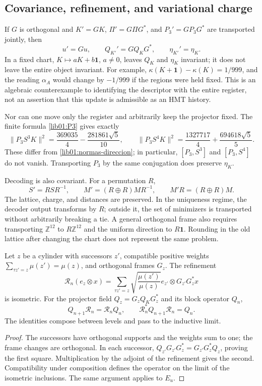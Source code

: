 \subsection{Covariance, refinement, and variational charge}
\label{lib01:covarianza}

If \(G\) is orthogonal and \(K'=GK\), \(\Pi'=G\Pi G^*\), and \(P_3'=GP_3G^*\) are transported jointly, then
\[
 u'=Gu,\qquad Q_{K'}'=GQ_KG^*,\qquad \eta_{K'}'=\eta_K.
\]
In a fixed chart, \(K\mapsto aK+b\mathbf1\), \(a\ne0\), leaves \(Q_K\) and \(\eta_K\) invariant; it does not leave the entire object invariant. For example, \(\kappa(K+\mathbf1)-\kappa(K)=1/999\), and the reading \(\alpha_A\) would change by \(-1/999\) if the regions were held fixed. This is an algebraic counterexample to identifying the descriptor with the entire register, not an assertion that this update is admissible as an HMT history.

Nor can one move only the register and arbitrarily keep the projector fixed. The finite formula \eqref{lib01:P3} gives exactly
\[
 \|P_3S^3K\|^2=\frac{369035}{4}-\frac{281861\sqrt5}{10},
 \qquad
 \|P_3S^4K\|^2=\frac{1327717}{4}+\frac{694618\sqrt5}{5}.
\]
These differ from \eqref{lib01:normas-direccion}; in particular, \([P_3,S^3]\) and \([P_3,S^4]\) do not vanish. Transporting \(P_3\) by the same conjugation does preserve \(\eta_K\).

Decoding is also covariant. For a permutation \(R\),
\[
 S'=RSR^{-1},\qquad M'=(R\oplus R)MR^{-1},\qquad
 M'R=(R\oplus R)M.
\]
The lattice, charge, and distances are preserved. In the uniqueness regime, the decoder output transforms by \(R\); outside it, the set of minimizers is transported without arbitrarily breaking a tie. A general orthogonal frame also requires transporting \(\mathbb Z^{12}\) to \(R\mathbb Z^{12}\) and the uniform direction to \(R\mathbf1\). Rounding in the old lattice after changing the chart does not represent the same problem.

\begin{proposition}
\label{lib01:refinamiento}
Let \(z\) be a cylinder with successors \(z'\), compatible positive weights \(\sum_{\tau z'=z}\mu(z')=\mu(z)\), and orthogonal frames \(G_z\). The refinement
\[
 \mathcal R_n(e_z\otimes x)=
 \sum_{\tau z'=z}\sqrt{\frac{\mu(z')}{\mu(z)}}
 e_{z'}\otimes G_{z'}G_z^*x
\]
is isometric. For the projector field \(Q_z=G_zQ_KG_z^*\) and its block operator \(Q_n\),
\[
 Q_{n+1}\mathcal R_n=\mathcal R_nQ_n,
 \qquad \mathcal R_n^*Q_{n+1}\mathcal R_n=Q_n.
\]
The identities compose between levels and pass to the inductive limit.
\end{proposition}
\begin{proof}
The successors have orthogonal supports and the weights sum to one; the frame changes are orthogonal. In each successor, \(Q_{z'}G_{z'}G_z^*=G_{z'}G_z^*Q_z\), proving the first square. Multiplication by the adjoint of the refinement gives the second. Compatibility under composition defines the operator on the limit of the isometric inclusions. The same argument applies to \(E_u\).
\end{proof}

